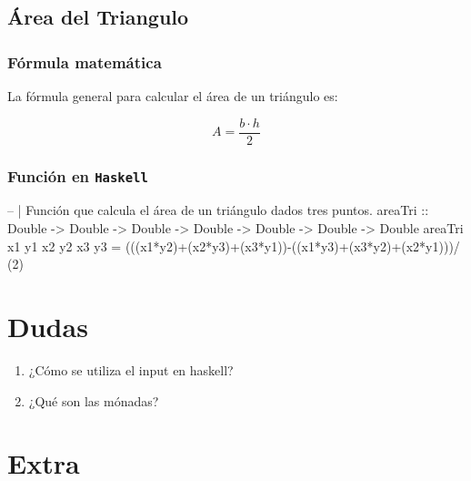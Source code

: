\documentclass[
]{article}
\newenvironment{Shaded}{\begin{snugshade}}{\end{snugshade}}
\newcommand{\DecValTok}[1]{\textcolor[rgb]{0.00,0.00,0.81}{#1}}
\newcommand{\NormalTok}[1]{#1}
\begin{document}
\hypertarget{uxe1rea-del-triangulo}{%
\subsection{Área del Triangulo}\label{uxe1rea-del-triangulo}}

\hypertarget{fuxf3rmula-matemuxe1tica-3}{%
\subsubsection{Fórmula matemática}\label{fuxf3rmula-matemuxe1tica-3}}

La fórmula general para calcular el área de un triángulo es:

\[
A = \frac{b\cdot h}{2}
\]

\hypertarget{funciuxf3n-en-haskell-3}{%
\subsubsection{\texorpdfstring{Función en
\texttt{Haskell}}{Función en Haskell}}\label{funciuxf3n-en-haskell-3}}

\begin{Shaded}
\begin{Highlighting}[]
\NormalTok{-- | Función que calcula el área de un triángulo dados tres puntos.}
\NormalTok{areaTri :: Double -> Double -> Double -> Double -> Double  -> Double -> Double}
\NormalTok{areaTri x1 y1 x2 y2 x3 y3  = (((x1*y2)+(x2*y3)+(x3*y1))-((x1*y3)+(x3*y2)+(x2*y1)))/ (}\DecValTok{2}\NormalTok{)}
\end{Highlighting}
\end{Shaded}

\hypertarget{dudas}{%
\section{Dudas}\label{dudas}}

\begin{enumerate}
\def\labelenumi{\arabic{enumi}.}
\item
  ¿Cómo se utiliza el input en haskell?
\item
  ¿Qué son las mónadas?
\end{enumerate}

\hypertarget{extra}{%
\section{Extra}\label{extra}}
\end{document}
